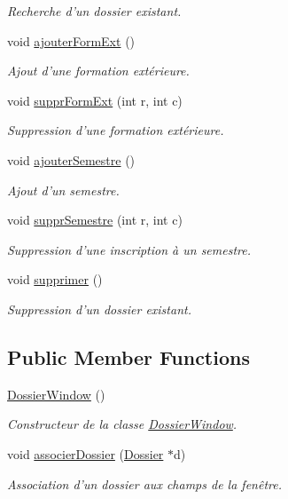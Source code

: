 \begin{DoxyCompactItemize}
\begin{DoxyCompactList}\small\item\em Recherche d'un dossier existant. \end{DoxyCompactList}\item 
void \hyperlink{class_dossier_window_a7b9d5a609e9838dc9f7eacd72d196e5e}{ajouter\-Form\-Ext} ()
\begin{DoxyCompactList}\small\item\em Ajout d'une formation extérieure. \end{DoxyCompactList}\item 
void \hyperlink{class_dossier_window_a7f5a0e6640ef760f57866c2cd58995a7}{suppr\-Form\-Ext} (int r, int c)
\begin{DoxyCompactList}\small\item\em Suppression d'une formation extérieure. \end{DoxyCompactList}\item 
void \hyperlink{class_dossier_window_a7d408ef7ea4239b0c9a0c7a16446105b}{ajouter\-Semestre} ()
\begin{DoxyCompactList}\small\item\em Ajout d'un semestre. \end{DoxyCompactList}\item 
void \hyperlink{class_dossier_window_a16be820f96498f8f8240ac683541e93a}{suppr\-Semestre} (int r, int c)
\begin{DoxyCompactList}\small\item\em Suppression d'une inscription à un semestre. \end{DoxyCompactList}\item 
void \hyperlink{class_dossier_window_a9a14055702b38bac1ea675a364a24277}{supprimer} ()
\begin{DoxyCompactList}\small\item\em Suppression d'un dossier existant. \end{DoxyCompactList}\end{DoxyCompactItemize}
\subsection*{Public Member Functions}
\begin{DoxyCompactItemize}
\item 
\hypertarget{class_dossier_window_abec87a1dfb4230a3b70a3de10852cfca}{\hyperlink{class_dossier_window_abec87a1dfb4230a3b70a3de10852cfca}{Dossier\-Window} ()}\label{class_dossier_window_abec87a1dfb4230a3b70a3de10852cfca}

\begin{DoxyCompactList}\small\item\em Constructeur de la classe \hyperlink{class_dossier_window}{Dossier\-Window}. \end{DoxyCompactList}\item 
void \hyperlink{class_dossier_window_aa5ef7660c92f59adbadc44bd7aa7f64d}{associer\-Dossier} (\hyperlink{class_dossier}{Dossier} $\ast$d)
\begin{DoxyCompactList}\small\item\em Association d'un dossier aux champs de la fenêtre. \end{DoxyCompactList}\end{DoxyCompactItemize}
